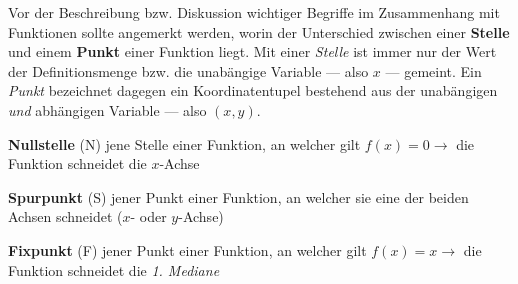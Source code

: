 
Vor der Beschreibung bzw. Diskussion wichtiger Begriffe im Zusammenhang mit Funktionen sollte angemerkt werden, worin der Unterschied zwischen einer \textbf{Stelle} und einem \textbf{Punkt} einer Funktion liegt. Mit einer \emph{Stelle} ist immer nur der Wert der Definitionsmenge bzw. die unab\"{a}ngige Variable --- also $x$ --- gemeint. Ein \emph{Punkt} bezeichnet dagegen ein Koordinatentupel bestehend aus der unab\"{a}ngigen \emph{und} abh\"{a}ngigen Variable --- also $(x, y)$.

\begin{figure}[h!]
	\centering
\end{figure}

\textbf{Nullstelle} (N)  jene Stelle einer Funktion, an welcher gilt $f(x) = 0 \rightarrow$ die Funktion schneidet die $x$-Achse

\textbf{Spurpunkt} (S)  jener Punkt einer Funktion, an welcher sie eine der beiden Achsen schneidet ($x$- oder $y$-Achse)

\textbf{Fixpunkt} (F)  jener Punkt einer Funktion, an welcher gilt $f(x) = x \rightarrow$ die Funktion schneidet die \emph{1. Mediane}



